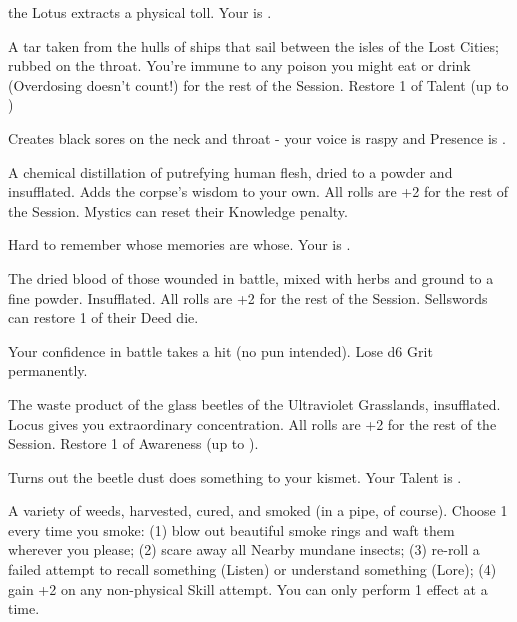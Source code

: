 {\begin{multicols}{2}
    the Lotus extracts a physical toll.  Your \MAX \VIG is \DCDOWN.


  A tar taken from the hulls of ships that sail between the isles of the Lost Cities; rubbed on the throat. You're immune to any poison you might eat or drink (Overdosing doesn't count!) for the rest of the Session. Restore 1 \UD of Talent (up to \MAX)

     Creates black sores on the neck and throat - your voice is raspy and \MAX Presence is \DCDOWN.



  A chemical distillation of putrefying human flesh, dried to a powder and insufflated. Adds the corpse's wisdom to your own.  All \INT rolls are +2 for the rest of the Session. Mystics can reset their Knowledge penalty.

     Hard to remember whose memories are whose.  Your \MAX \FOC is \DCDOWN.


    The dried blood of those wounded in battle, mixed with herbs and ground to a fine powder.  Insufflated.  All \VIG rolls are +2 for the rest of the Session. Sellswords can restore 1 \UD of their Deed die.

     Your confidence in battle takes a hit (no pun intended).  Lose d6 Grit permanently.



  The waste product of the glass beetles of the Ultraviolet Grasslands, insufflated.  Locus gives you extraordinary concentration.  All \FOC rolls are +2 for the rest of the Session.  Restore 1 \UD of Awareness (up to \MAX).

    Turns out the beetle dust does something to your kismet.   Your \MAX Talent is \DCDOWN.



  A variety of weeds, harvested, cured, and smoked (in a pipe, of course). Choose 1 every time you smoke: (1) blow out beautiful smoke rings and waft them wherever you please; (2) scare away all Nearby mundane insects; (3) re-roll a failed attempt to recall something (Listen) or understand something (Lore); (4) gain +2 on any non-physical Skill \RO attempt.  You can only perform 1 effect at a time.  


\end{multicols}}
